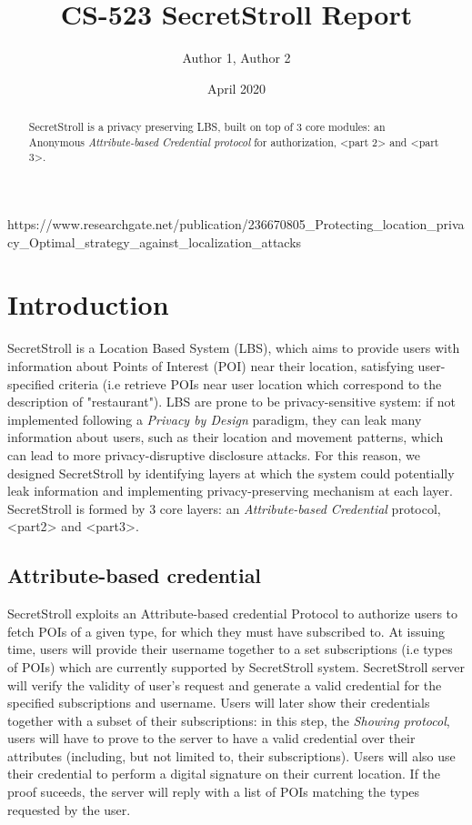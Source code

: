 \documentclass[10pt,conference,compsocconf]{IEEEtran}
\title{CS-523 SecretStroll Report}
\author{Author 1, Author 2}
\date{April 2020}
\begin{document}
\begin{thebibliography}{}
https://www.researchgate.net/publication/236670805\_Protecting\_location\_privacy\_Optimal\_strategy\_against\_localization\_attacks
\end{thebibliography}

\maketitle

\begin{abstract}
    SecretStroll is a privacy preserving LBS, built on top of 3 core modules: an Anonymous
    \textit{Attribute-based Credential protocol} for authorization, <part 2> and <part 3>.
\end{abstract}

\section{Introduction}
SecretStroll is a Location Based System (LBS), which aims to provide users with information about Points of Interest (POI)
near their location, satisfying user-specified criteria (i.e retrieve POIs near user location which correspond to the description
of "restaurant").\newline
LBS are prone to be privacy-sensitive system: if not implemented following a \textit{Privacy by Design} paradigm, they can leak
many information about users, such as their location and movement patterns, which can lead to more privacy-disruptive disclosure attacks.
For this reason, we designed SecretStroll by identifying layers at which the system could potentially leak information and implementing
privacy-preserving mechanism at each layer.\newline
SecretStroll is formed by 3 core layers: an \textit{Attribute-based Credential} protocol, <part2> and <part3>.
\subsection{Attribute-based credential}
SecretStroll exploits an Attribute-based credential Protocol to authorize users to fetch POIs of a given type, for which they must have subscribed to.
At issuing time, users will provide their username together to a set subscriptions (i.e types of POIs) which are currently supported
by SecretStroll system. SecretStroll server will verify the validity of user's request and generate a valid credential for the specified
subscriptions and username. Users will later show their credentials together with a subset of their subscriptions: in this step,
the \textit{Showing protocol}, users will have to prove to the server to have a valid credential over their attributes
(including, but not limited to, their subscriptions). Users will also use their credential to perform a digital signature
on their current location. If the proof suceeds, the server will reply with a list of POIs matching the types requested by the user.
\end{document}
